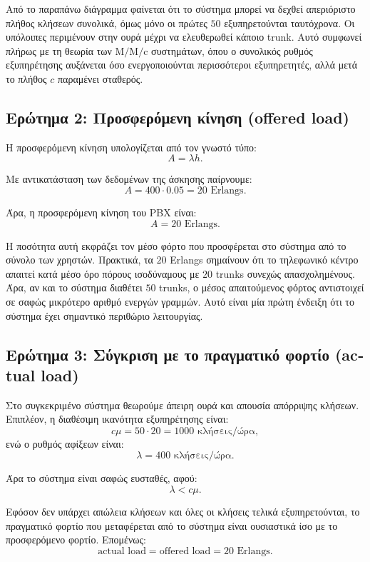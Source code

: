 \documentclass{article}
\begin{document}
Από το παραπάνω διάγραμμα φαίνεται ότι το σύστημα μπορεί να δεχθεί απεριόριστο πλήθος κλήσεων συνολικά, όμως μόνο οι πρώτες $50$ εξυπηρετούνται ταυτόχρονα. Οι υπόλοιπες περιμένουν στην ουρά μέχρι να ελευθερωθεί κάποιο trunk. Αυτό συμφωνεί πλήρως με τη θεωρία των $\mathrm{M/M/c}$ συστημάτων, όπου ο συνολικός ρυθμός εξυπηρέτησης αυξάνεται όσο ενεργοποιούνται περισσότεροι εξυπηρετητές, αλλά μετά το πλήθος $c$ παραμένει σταθερός.

\subsection{Ερώτημα 2: Προσφερόμενη κίνηση (\foreignlanguage{english}{offered load})}

Η προσφερόμενη κίνηση υπολογίζεται από τον γνωστό τύπο:
\[
A = \lambda h.
\]

Με αντικατάσταση των δεδομένων της άσκησης παίρνουμε:
\[
A = 400 \cdot 0.05 = 20 \text{ Erlangs}.
\]

Άρα, η προσφερόμενη κίνηση του PBX είναι:
\[
\boxed{A = 20 \text{ Erlangs}}.
\]

Η ποσότητα αυτή εκφράζει τον μέσο φόρτο που προσφέρεται στο σύστημα από το σύνολο των χρηστών. Πρακτικά, τα $20$ Erlangs σημαίνουν ότι το τηλεφωνικό κέντρο απαιτεί κατά μέσο όρο πόρους ισοδύναμους με $20$ trunks συνεχώς απασχολημένους. Άρα, αν και το σύστημα διαθέτει $50$ trunks, ο μέσος απαιτούμενος φόρτος αντιστοιχεί σε σαφώς μικρότερο αριθμό ενεργών γραμμών. Αυτό είναι μία πρώτη ένδειξη ότι το σύστημα έχει σημαντικό περιθώριο λειτουργίας.

\subsection{Ερώτημα 3: Σύγκριση με το πραγματικό φορτίο (\foreignlanguage{english}{actual load})}

Στο συγκεκριμένο σύστημα θεωρούμε άπειρη ουρά και απουσία απόρριψης κλήσεων. Επιπλέον, η διαθέσιμη ικανότητα εξυπηρέτησης είναι:
\[
c\mu = 50 \cdot 20 = 1000 \text{ κλήσεις/ώρα},
\]
ενώ ο ρυθμός αφίξεων είναι:
\[
\lambda = 400 \text{ κλήσεις/ώρα}.
\]

Άρα το σύστημα είναι σαφώς ευσταθές, αφού:
\[
\lambda < c\mu.
\]

Εφόσον δεν υπάρχει απώλεια κλήσεων και όλες οι κλήσεις τελικά εξυπηρετούνται, το πραγματικό φορτίο που μεταφέρεται από το σύστημα είναι ουσιαστικά ίσο με το προσφερόμενο φορτίο. Επομένως:
\[
\text{actual load} = \text{offered load} = 20 \text{ Erlangs}.
\]
\end{document}
